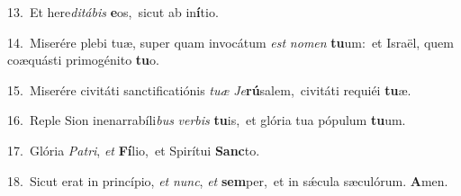 {\numbfont\textcolor{\numbcolor}{13.}}~Et here\-\textit{di}\-\textit{tá}\textit{bis} \textbf{e}\-os,~\star sicut ab in\-\textbf{í}\-tio.\par
{\numbfont\textcolor{\numbcolor}{14.}}~Miserére plebi tuæ, super quam invocátum \textit{est} \textit{no}\-\textit{men} \textbf{tu}\-um:~\star et Israël, quem coæquásti primogénito \textbf{tu}\-o.\par
{\numbfont\textcolor{\numbcolor}{15.}}~Miserére civitáti sanctificatiónis \textit{tu}\-\textit{æ} \textit{Je}\-\textbf{rú}salem,~\star civitáti requiéi \textbf{tu}\-æ.\par
{\numbfont\textcolor{\numbcolor}{16.}}~Reple Sion inenarrabíli\textit{bus} \textit{ver}\-\textit{bis} \textbf{tu}\-is,~\star et glória tua pópulum \textbf{tu}\-um.\par
{\numbfont\textcolor{\numbcolor}{17.}}~Glória \textit{Pa}\-\textit{tri}, \textit{et} \textbf{Fí}\-lio,~\star et Spirítui \textbf{Sanc}\-to.\par
{\numbfont\textcolor{\numbcolor}{18.}}~Sicut erat in princípio, \textit{et} \textit{nunc}\-, \textit{et} \textbf{sem}\-per,~\star et in sǽcula sæculórum. \textbf{A}\-men.\par
